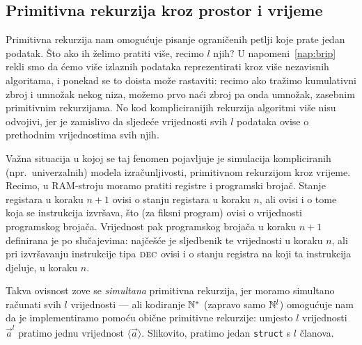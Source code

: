 \subsection{Primitivna rekurzija kroz prostor i vrijeme}

Primitivna rekurzija nam omogućuje pisanje ograničenih petlji koje prate jedan podatak. Što ako ih želimo pratiti više, recimo $l$ njih? U napomeni~\ref{nap:brip} rekli smo da ćemo više izlaznih podataka reprezentirati kroz više nezavisnih algoritama, i ponekad se to doista može rastaviti: recimo ako tražimo kumulativni zbroj i umnožak nekog niza, možemo prvo naći zbroj pa onda umnožak, zasebnim primitivnim rekurzijama. No kod kompliciranijih rekurzija algoritmi više nisu odvojivi, jer je zamislivo da sljedeće vrijednosti svih $l$ podataka ovise o prethodnim vrijednostima svih njih.

Važna situacija u kojoj se taj fenomen pojavljuje je simulacija kompliciranih (npr.\ univerzalnih) modela izračunljivosti, primitivnom rekurzijom kroz vrijeme. Recimo, u RAM-stroju moramo pratiti registre i programski brojač. Stanje registara u koraku $n+1$ ovisi o stanju registara u koraku $n$, ali ovisi i o tome koja se instrukcija izvršava, što (za fiksni program) ovisi o vrijednosti programskog brojača. Vrijednost pak programskog brojača u koraku $n+1$ definirana je po slučajevima: najčešće je sljedbenik te vrijednosti u koraku $n$, ali pri izvršavanju instrukcije tipa $\textsc{dec}$ ovisi i o stanju registra na koji ta instrukcija djeluje, u koraku $n$.

Takva ovisnost zove se \emph{simultana} primitivna rekurzija, jer moramo simultano ra\-ču\-na\-ti svih $l$ vrijednosti --- ali kodiranje ${\mathbb N}^*$ (zapravo samo ${\mathbb N}^l$) omogućuje nam da je implementiramo pomoću obične primitivne rekurzije: umjesto $l$ vrijednosti $\vec a^l$ pratimo jednu vrijednost $\langle\vec a\rangle$. Slikovito, pratimo jedan \texttt{struct} s $l$ članova.

